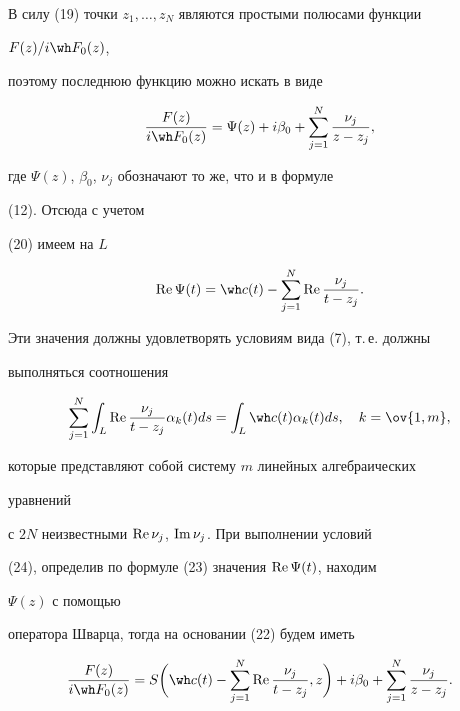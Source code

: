 В силу (19) точки $z_1,\dotsc,z_N$ являются простыми полюсами функции 


$F(z)/i\wh F_0(z)$, 


поэтому последнюю функцию можно искать в виде 


\begin{equation} 


\frac{F(z)}{i\wh F_0(z)}=\Psi(z)+i\beta_0+ 


\sum^N_{j=1}\frac{\nu_j}{z-z_j}, 


\end{equation} 


где $\Psi(z)$, $\beta_0$, $\nu_j$ обозначают то же, что и в формуле 


(12). Отсюда с учетом 


(20) имеем на $L$ 


\begin{equation} 


\re\Psi(t)=\wh c(t)-\sum^N_{j=1}\re 


\frac{\nu_j}{t-z_j}. 


\end{equation} 


Эти значения должны удовлетворять условиям вида (7), т.\,е. должны 


выполняться соотношения 


\begin{equation} 


\sum^N_{j=1}\int_L\re\frac{\nu_j}{t-z_j} 


\alpha_k(t)ds=\int_L \wh c(t)\alpha_k(t)ds,\quad 


k=\ov{1,m}, 


\end{equation} 


которые представляют собой систему $m$ линейных алгебраических 


уравнений 


с $2N$ неизвестными $\operatorname{Re}\nu_j$, $\operatorname{Im}\nu_j$. При выполнении условий 


(24), определив по формуле (23) значения $\operatorname{Re}\Psi(t)$, находим 


$\Psi(z)$ с помощью 


оператора Шварца, тогда на основании (22) будем иметь 


\begin{equation} 


\frac{F(z)}{i\wh F_0(z)}=S\bigg(\wh c(t)- 


\sum^N_{j=1}\re\frac{\nu_j}{t-z_j},z\bigg)+ 


i\beta_0+\sum^N_{j=1}\frac{\nu_j}{z-z_j}. 


\end{equation} 


